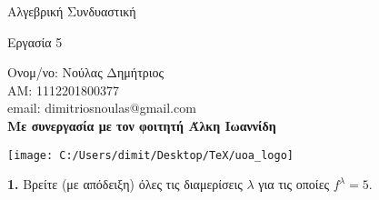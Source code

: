 \documentclass[oneside,a4paper]{article}
\newcommand {\tl}{\textlatin}
\begin{document}
	
	
	\begin{framed}	
		\begin{center}
			\huge Αλγεβρική Συνδυαστική
		\end{center}
		\begin{center}
			\huge Εργασία 5
		\end{center}
		\vspace{0.3truecm}
		\begin{center}
			Ονομ/νο: Νούλας Δημήτριος\\
			ΑΜ: 1112201800377\\
			\tl{email}: \tl{dimitriosnoulas@gmail.com} \\
			\vspace{0.1cm}
			\textbf{Με συνεργασία με τον φοιτητή Άλκη Ιωαννίδη}
		\end{center}
		\vspace{0.3truecm}
	\end{framed}
	\vspace*{\fill}
	\begin{center}
	\texttt{[image: C:/Users/dimit/Desktop/TeX/uoa\_logo]}
	\end{center}
\vspace{1cm}
\pagebreak


\noindent \textbf{1. } Βρείτε (με απόδειξη) όλες τις διαμερίσεις $\lambda$ για τις οποίες $f^{\lambda} = 5$.
\end{document}
